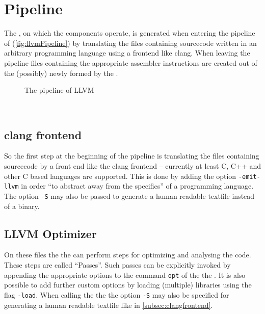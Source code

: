 \section{Pipeline}
The \llvmir, on which the components operate, is generated when entering the pipeline of \llvm (\autoref{fig:llvmPipeline}) by translating the files containing sourcecode written in an arbitrary programming language using a frontend like clang.
When leaving the pipeline files containing the appropriate assembler instructions are created out of the (possibly) newly formed \llvmir by the \generator. \cite{IntroLLVM}
\begin{figure}[!ht]
    \caption{The pipeline of LLVM}
    \label{fig:llvmPipeline}
    \centering
    \legend
\end{figure}\\
\subsection{clang frontend}\label{subsec:clangfrontend}
So the first step at the beginning of the pipeline is translating the files containing sourcecode by a front end like the clang frontend -- currently at least C, C++ and other C based languages are supported.
This is done by adding the option \texttt{-emit-llvm} in order \enquote{to abstract away from the specifics} \cite{FastScopDetection} of a programming language.
The option \texttt{-S} may also be passed to generate a human readable textfile instead of a \llvmir binary.
\subsection{LLVM Optimizer}\label{subsec:optimizer}
On these files the the \opt can perform steps for optimizing and analysing the code.
These steps are called \enquote{Passes}.
Such passes can be explicitly invoked by appending the appropriate options to the command \texttt{opt} of the the \opt.
It is also possible to add further custom options by loading (multiple) libraries using the flag \texttt{-load}.
When calling the the \opt the option \texttt{-S} may also be specified for generating a human readable textfile like in \autoref{subsec:clangfrontend}.\\
